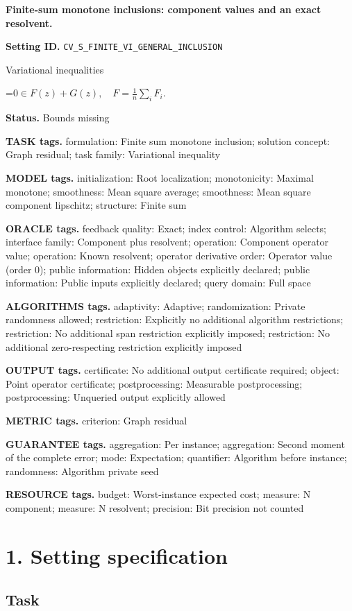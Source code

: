 \documentclass[10pt,a4paper]{article}
\newcommand{\AtlasMath}[1]{\par\begingroup\centering\setbox0=\hbox{$\displaystyle #1$}\ifdim\wd0>1.4\linewidth\typeout{ATLAS WIDE FORMULA: \the\wd0}\fi\ifdim\wd0>\linewidth\resizebox{\linewidth}{!}{\box0}\else\box0\fi\par\endgroup}
\begin{document}
\raggedright

{\LARGE\bfseries\sffamily\color{AtlasNavy} Finite-sum monotone inclusions: component values and an exact resolvent.\par}\vspace{5pt}
\textbf{Setting ID.} \texttt{CV\_\allowbreak{}S\_\allowbreak{}FINITE\_\allowbreak{}VI\_\allowbreak{}GENERAL\_\allowbreak{}INCLUSION}

Variational inequalities


\AtlasMath{0\in F(z)+G(z),\quad F=\frac1n\sum_iF_i.}


\textbf{Status.} Bounds missing

\textbf{TASK tags.} formulation: Finite sum monotone inclusion; solution concept: Graph residual; task family: Variational inequality

\textbf{MODEL tags.} initialization: Root localization; monotonicity: Maximal monotone; smoothness: Mean square average; smoothness: Mean square component lipschitz; structure: Finite sum

\textbf{ORACLE tags.} feedback quality: Exact; index control: Algorithm selects; interface family: Component plus resolvent; operation: Component operator value; operation: Known resolvent; operator derivative order: Operator value (order 0); public information: Hidden objects explicitly declared; public information: Public inputs explicitly declared; query domain: Full space

\textbf{ALGORITHMS tags.} adaptivity: Adaptive; randomization: Private randomness allowed; restriction: Explicitly no additional algorithm restrictions; restriction: No additional span restriction explicitly imposed; restriction: No additional zero-respecting restriction explicitly imposed

\textbf{OUTPUT tags.} certificate: No additional output certificate required; object: Point operator certificate; postprocessing: Measurable postprocessing; postprocessing: Unqueried output explicitly allowed

\textbf{METRIC tags.} criterion: Graph residual

\textbf{GUARANTEE tags.} aggregation: Per instance; aggregation: Second moment of the complete error; mode: Expectation; quantifier: Algorithm before instance; randomness: Algorithm private seed

\textbf{RESOURCE tags.} budget: Worst-instance expected cost; measure: N component; measure: N resolvent; precision: Bit precision not counted

\section{1. Setting specification}
\subsection{Task}
\end{document}

